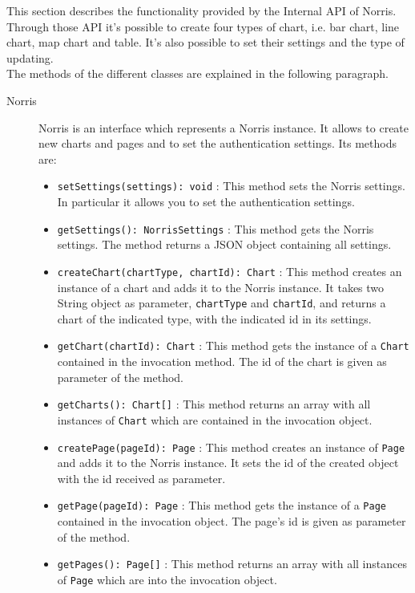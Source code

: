 	This section describes the functionality provided by the Internal API of Norris. Through those API it's possible to create four types of chart, i.e. bar chart, line chart, map chart and table. It's also possible to set their settings and the type of updating.\\ The methods of the different classes are explained in the following paragraph.
	\begin{description}
	\item[Norris] Norris is an interface which represents a Norris instance. It allows to create new charts and pages and to set the authentication settings. Its methods are:
		\begin{itemize}
		\item \texttt{setSettings(settings): void} : This method sets the Norris settings. In particular it allows you to set the authentication settings.
		\item \texttt{getSettings(): NorrisSettings} : This method gets the Norris settings. The method returns a JSON object containing all settings.
		\item \texttt{createChart(chartType, chartId): Chart} : This method creates an instance of a chart and adds it to the Norris instance. It takes two String object as parameter, \texttt{chartType} and \texttt{chartId}, and returns a chart of the indicated type, with the indicated id in its settings.
		\item \texttt{getChart(chartId): Chart} : This method gets the instance of a \texttt{Chart} contained in the invocation method. The id of the chart is given as parameter of the method.
		\item \texttt{getCharts(): Chart[]} : This method returns an array with all instances of \texttt{Chart} which are contained in the invocation object.
		\item \texttt{createPage(pageId): Page} : This method creates an instance of \texttt{Page} and adds it to the Norris instance. It sets the id of the created object with the id received as parameter.
		\item \texttt{getPage(pageId): Page} : This method gets the instance of a \texttt{Page} contained in the invocation object. The page's id is given as parameter of the method.
		\item \texttt{getPages(): Page[]} : This method returns an array with all instances of \texttt{Page} which are into the invocation object.
		

\end{itemize}
\end{description}
